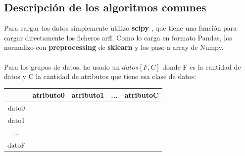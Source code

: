 \documentclass[12pt,a4paper]{article}
\begin{document}
\subsection{Descripción de los algoritmos comunes}
Para cargar los datos simplemente utilizo \textbf{scipy} \cite{spiz}, que tiene una función para cargar directamente los ficheros arff. Como lo carga en formato Pandas, los normalizo con \textbf{preprocessing}   de \textbf{sklearn} \cite{Baz}
 y los paso a array de Numpy. \\\\
Para los grupos de datos, he usado un $datos[F,C]$ donde F es la cantidad de datos y C la cantidad de atributos que tiene esa clase de datos:
\begin{table}[H]
	\centering
	\begin{tabular}{|c|c|c|c|c|}
		\hline 
			\backslashbox{Datos}{Atributos}& atributo0 & atributo1 & ... & atributoC \\ 
		\hline 
		dato0 &  &  &  &  \\ 
		\hline 
		dato1 &  &  &  &  \\ 
		\hline 
		... &  &  &  &  \\ 
		\hline 
		datoF &  &  &  &  \\ 
		\hline 
	\end{tabular} 
\end{table}
\end{document}
